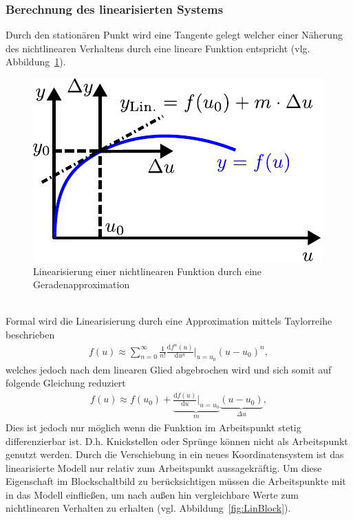 \subsubsection{Berechnung des linearisierten Systems}
%
Durch den stationären Punkt wird eine Tangente gelegt welcher einer Näherung des nichtlinearen Verhaltens durch eine lineare Funktion entspricht (vlg. Abbildung~\ref{fig:Linearisierung}).
%
\begin{figure}[h]
	\centering
	\includegraphics[width=0.45\linewidth]{Abbildungen/Modellbildung/PDF/Linearisierung.pdf}
	\caption{Linearisierung einer nichtlinearen Funktion durch eine Geradenapproximation}
	\label{fig:Linearisierung}
\end{figure}\\
%
Formal wird die Linearisierung durch eine Approximation mittels Taylorreihe beschrieben 
%
\begin{equation*}
\begin{aligned}
%
f(u)\approx \sum_{n=0}^{\infty}\frac{1}{n!} \frac{\text{d}f^{n}(u)}{\text{d}u^{n}}\bigg\rvert_{u=u_{0}}\left(u-u_{0}\right)^{n},
%
\end{aligned}
\end{equation*}
%
welches jedoch nach dem linearen Glied abgebrochen wird und sich somit auf folgende Gleichung reduziert
%
\begin{equation*}
\begin{aligned}
%
f(u)\approx f(u_{0})+\underbrace{\frac{\text{d}f(u)}{\text{d}u}\bigg\rvert_{u=u_{0}}}_{m}\underbrace{\left(u-u_{0}\right)}_{\Delta u},
%
\end{aligned}
\end{equation*}
%
Dies ist jedoch nur möglich wenn die Funktion im Arbeitspunkt stetig differenzierbar ist. D.h. Knickstellen oder Sprünge können nicht als Arbeitspunkt genutzt werden.
%
Durch die Verschiebung in ein neues Koordinatensystem ist das linearisierte Modell nur relativ zum Arbeitspunkt aussagekräftig. Um diese Eigenschaft im Blockschaltbild zu berücksichtigen müssen die Arbeitspunkte mit in das Modell einfließen, um nach außen hin vergleichbare Werte zum nichtlinearen Verhalten zu erhalten (vgl. Abbildung~\ref{fig:LinBlock}).
